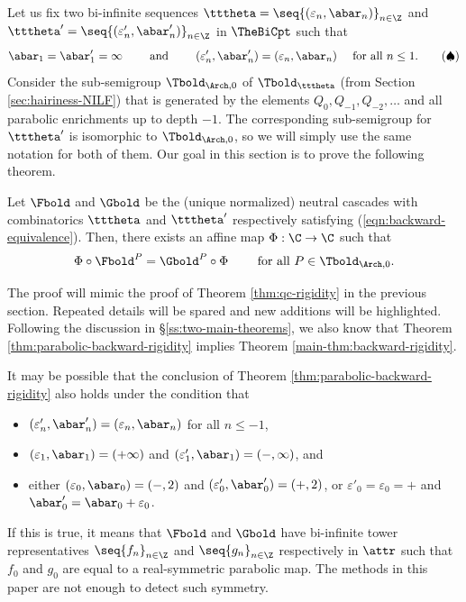 \documentclass{amsart}
\begin{document}
Let us fix two bi-infinite sequences $\tttheta = \seq{ (\varepsilon_n, \abar_n) } _{n \in \Z}$ and $\tttheta' = \seq{ (\varepsilon'_n, \abar'_n) } _{n \in \Z}$ in $\TheBiCpt$ such that 
\begin{align}
\label{eqn:backward-equivalence}
    \abar_1 = \abar'_1 = \infty
    \qquad \text{ and } \qquad 
    (\varepsilon'_n, \abar'_n) = (\varepsilon_n, \abar_n) \quad \text{ for all } n \leq 1.
    \tag{$\spadesuit$}
\end{align}
Consider the sub-semigroup $\Tbold_{\Arch,0}$ of $\Tbold_{\tttheta}$ (from Section \ref{sec:hairiness-NILF}) that is generated by the elements $Q_0,Q_{-1}, Q_{-2},\ldots$ and all parabolic enrichments up to depth $-1$.
The corresponding sub-semigroup for $\tttheta'$ is isomorphic to $\Tbold_{\Arch,0}$, so we will simply use the same notation for both of them.
Our goal in this section is to prove the following theorem.

\begin{theorem}
\label{thm:parabolic-backward-rigidity}
    Let $\Fbold$ and $\Gbold$ be the (unique normalized) neutral cascades with combinatorics $\tttheta$ and $\tttheta'$ respectively satisfying \textnormal{(\ref{eqn:backward-equivalence})}.
    Then, there exists an affine map $\Phi: \C \to \C$ such that
    \[
        \Phi \circ \Fbold^P = \Gbold^P \circ \Phi \qquad \text{ for all } P \in \Tbold_{\Arch,0}.
    \]
\end{theorem}

The proof will mimic the proof of Theorem \ref{thm:qc-rigidity} in the previous section.
Repeated details will be spared and new additions will be highlighted.
Following the discussion in \S\ref{ss:two-main-theorems}, we also know that Theorem \ref{thm:parabolic-backward-rigidity} implies Theorem \ref{main-thm:backward-rigidity}.

\begin{remark}
    It may be possible that the conclusion of Theorem \ref{thm:parabolic-backward-rigidity} also holds under the condition that 
    \begin{itemize}
        \item $(\varepsilon'_n, \abar'_n) = (\varepsilon_n, \abar_n)$ for all $n \leq -1$,
        \item $(\varepsilon_1,\abar_1) = (+ \infty)$ and $(\varepsilon'_1,\abar_1) = (-, \infty)$, and
        \item either $(\varepsilon_0, \abar_0) = (-,2)$ and $(\varepsilon'_0, \abar'_0) = (+,2)$, or $\varepsilon'_0 = \varepsilon_0 = +$ and $\abar'_0 = \abar_0 + \varepsilon_0$.
    \end{itemize}
    If this is true, it means that $\Fbold$ and $\Gbold$ have bi-infinite tower representatives $\seq{f_n}_{n\in \Z}$ and $\seq{g_n}_{n\in \Z}$ respectively in $\attr$ such that $f_0$ and $g_0$ are equal to a real-symmetric parabolic map.
    The methods in this paper are not enough to detect such symmetry.
\end{remark}
\end{document}
